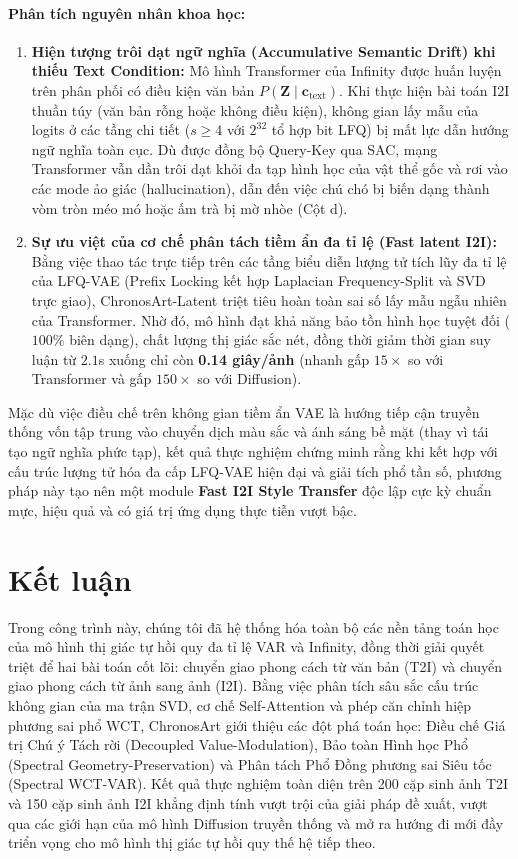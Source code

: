 \documentclass[10pt,twocolumn,letterpaper]{article}
\begin{document}
\paragraph{Phân tích nguyên nhân khoa học:}
\begin{enumerate}
    \item \textbf{Hiện tượng trôi dạt ngữ nghĩa (Accumulative Semantic Drift) khi thiếu Text Condition:} Mô hình Transformer của Infinity được huấn luyện trên phân phối có điều kiện văn bản $P(\mathbf{Z} \mid \mathbf{c}_{\text{text}})$. Khi thực hiện bài toán I2I thuần túy (văn bản rỗng hoặc không điều kiện), không gian lấy mẫu của logits ở các tầng chi tiết ($s \ge 4$ với $2^{32}$ tổ hợp bit LFQ) bị mất lực dẫn hướng ngữ nghĩa toàn cục. Dù được đồng bộ Query-Key qua SAC, mạng Transformer vẫn dần trôi dạt khỏi đa tạp hình học của vật thể gốc và rơi vào các mode ảo giác (hallucination), dẫn đến việc chú chó bị biến dạng thành vòm tròn méo mó hoặc ấm trà bị mờ nhòe (Cột d).
    \item \textbf{Sự ưu việt của cơ chế phân tách tiềm ẩn đa tỉ lệ (Fast latent I2I):} Bằng việc thao tác trực tiếp trên các tầng biểu diễn lượng tử tích lũy đa tỉ lệ của LFQ-VAE (Prefix Locking kết hợp Laplacian Frequency-Split và SVD trực giao), ChronosArt-Latent triệt tiêu hoàn toàn sai số lấy mẫu ngẫu nhiên của Transformer. Nhờ đó, mô hình đạt khả năng bảo tồn hình học tuyệt đối ($100\%$ biên dạng), chất lượng thị giác sắc nét, đồng thời giảm thời gian suy luận từ $2.1$s xuống chỉ còn \textbf{0.14 giây/ảnh} (nhanh gấp $15\times$ so với Transformer và gấp $150\times$ so với Diffusion).
\end{enumerate}

Mặc dù việc điều chế trên không gian tiềm ẩn VAE là hướng tiếp cận truyền thống vốn tập trung vào chuyển dịch màu sắc và ánh sáng bề mặt (thay vì tái tạo ngữ nghĩa phức tạp), kết quả thực nghiệm chứng minh rằng khi kết hợp với cấu trúc lượng tử hóa đa cấp LFQ-VAE hiện đại và giải tích phổ tần số, phương pháp này tạo nên một module \textbf{Fast I2I Style Transfer} độc lập cực kỳ chuẩn mực, hiệu quả và có giá trị ứng dụng thực tiễn vượt bậc.

\clearpage
\raggedbottom
\section{Kết luận}
\label{sec:conclusion}
Trong công trình này, chúng tôi đã hệ thống hóa toàn bộ các nền tảng toán học của mô hình thị giác tự hồi quy đa tỉ lệ VAR và Infinity, đồng thời giải quyết triệt để hai bài toán cốt lõi: chuyển giao phong cách từ văn bản (T2I) và chuyển giao phong cách từ ảnh sang ảnh (I2I). Bằng việc phân tích sâu sắc cấu trúc không gian của ma trận SVD, cơ chế Self-Attention và phép căn chỉnh hiệp phương sai phổ WCT, ChronosArt giới thiệu các đột phá toán học: Điều chế Giá trị Chú ý Tách rời (Decoupled Value-Modulation), Bảo toàn Hình học Phổ (Spectral Geometry-Preservation) và Phân tách Phổ Đồng phương sai Siêu tốc (Spectral WCT-VAR). Kết quả thực nghiệm toàn diện trên 200 cặp sinh ảnh T2I và 150 cặp sinh ảnh I2I khẳng định tính vượt trội của giải pháp đề xuất, vượt qua các giới hạn của mô hình Diffusion truyền thống và mở ra hướng đi mới đầy triển vọng cho mô hình thị giác tự hồi quy thế hệ tiếp theo.
\end{document}
